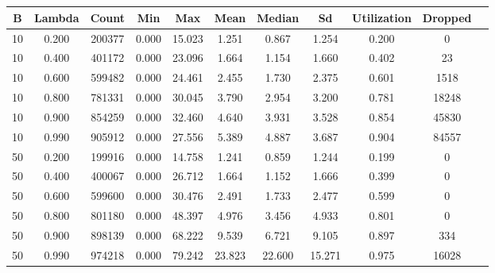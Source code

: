\documentclass{article}
\begin{document}
\section{}

\section{}
\begin{tabular}{c | c | c | c | c | c | c | c | c | c | c}
	B         & Lambda    & Count     & Min       & Max       & Mean      & Median    & Sd        & Utilization & Dropped   \\
	\hline
	10        & 0.200     & 200377    & 0.000     & 15.023    & 1.251     & 0.867     & 1.254     & 0.200     & 0         \\
	10        & 0.400     & 401172    & 0.000     & 23.096    & 1.664     & 1.154     & 1.660     & 0.402     & 23        \\
	10        & 0.600     & 599482    & 0.000     & 24.461    & 2.455     & 1.730     & 2.375     & 0.601     & 1518      \\
	10        & 0.800     & 781331    & 0.000     & 30.045    & 3.790     & 2.954     & 3.200     & 0.781     & 18248     \\
	10        & 0.900     & 854259    & 0.000     & 32.460    & 4.640     & 3.931     & 3.528     & 0.854     & 45830     \\
	10        & 0.990     & 905912    & 0.000     & 27.556    & 5.389     & 4.887     & 3.687     & 0.904     & 84557     \\
	50        & 0.200     & 199916    & 0.000     & 14.758    & 1.241     & 0.859     & 1.244     & 0.199     & 0         \\
	50        & 0.400     & 400067    & 0.000     & 26.712    & 1.664     & 1.152     & 1.666     & 0.399     & 0         \\
	50        & 0.600     & 599600    & 0.000     & 30.476    & 2.491     & 1.733     & 2.477     & 0.599     & 0         \\
	50        & 0.800     & 801180    & 0.000     & 48.397    & 4.976     & 3.456     & 4.933     & 0.801     & 0         \\
	50        & 0.900     & 898139    & 0.000     & 68.222    & 9.539     & 6.721     & 9.105     & 0.897     & 334       \\
	50        & 0.990     & 974218    & 0.000     & 79.242    & 23.823    & 22.600    & 15.271    & 0.975     & 16028     \\
\end{tabular} \\
\end{document}
